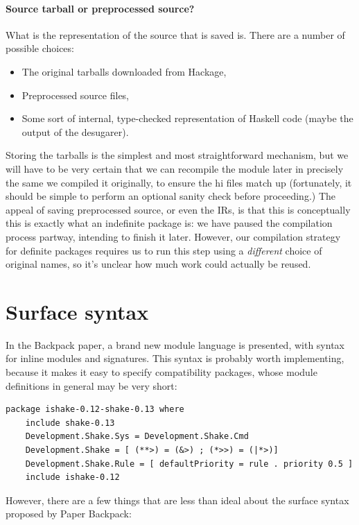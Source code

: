 \documentclass{article}
\begin{document}
\paragraph{Source tarball or preprocessed source?}  What is the representation of the source that is saved is.  There
are a number of possible choices:

\begin{itemize}
    \item The original tarballs downloaded from Hackage,
    \item Preprocessed source files,
    \item Some sort of internal, type-checked representation of Haskell code (maybe the output of the desugarer).
\end{itemize}

Storing the tarballs is the simplest and most straightforward mechanism,
but we will have to be very certain that we can recompile the module
later in precisely the same we compiled it originally, to ensure the hi
files match up (fortunately, it should be simple to perform an optional
sanity check before proceeding.) The appeal of saving preprocessed
source, or even the IRs, is that this is conceptually this is exactly
what an indefinite package is: we have paused the compilation process
partway, intending to finish it later.  However, our compilation strategy
for definite packages requires us to run this step using a \emph{different}
choice of original names, so it's unclear how much work could actually be reused.

\section{Surface syntax}

In the Backpack paper, a brand new module language is presented, with
syntax for inline modules and signatures.  This syntax is probably worth implementing,
because it makes it easy to specify compatibility packages, whose module
definitions in general may be very short:

\begin{verbatim}
package ishake-0.12-shake-0.13 where
    include shake-0.13
    Development.Shake.Sys = Development.Shake.Cmd
    Development.Shake = [ (**>) = (&>) ; (*>>) = (|*>)]
    Development.Shake.Rule = [ defaultPriority = rule . priority 0.5 ]
    include ishake-0.12
\end{verbatim}

However, there are a few things that are less than ideal about the
surface syntax proposed by Paper Backpack:
\end{document}
